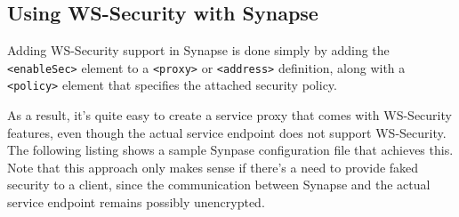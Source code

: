 
\subsection{Using WS-Security with Synapse}
\label{subsec:using-ws-security-with Synapse}

Adding WS-Security support in Synapse is done simply by
adding the \texttt{<enableSec>} element to a \texttt{<proxy>} or
\texttt{<address>} definition, along with a \texttt{<policy>} element that
specifies the attached security policy.

As a result, it's quite easy to create a service proxy that comes with
WS-Security features, even though the actual service endpoint does not support
WS-Security. The following listing shows a sample Synpase configuration file
that achieves this. Note that this approach only makes sense if there's a need
to provide faked security to a client, since the communication between Synapse
and the actual service endpoint remains possibly unencrypted.

\newpage
\lstset{caption=, label=sample-security-xml}


